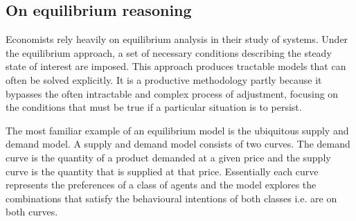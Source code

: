 





\subsection{On equilibrium reasoning }
Economists rely heavily on equilibrium analysis in their study of systems. 
Under the equilibrium approach, a set of necessary conditions describing the steady state of interest are imposed. This approach produces tractable models that can often be solved explicitly. It is a productive methodology partly because it bypasses the often intractable and complex process of adjustment, focusing on the conditions that must be true if a particular situation is to persist. 


The most familiar example of an equilibrium model is the ubiquitous supply and demand model. A supply and demand model consists of two curves. The demand curve is the quantity of a product demanded at a given price and the supply curve is the quantity that is supplied at that price. Essentially each curve represents the preferences of a class of agents and the model explores the combinations that satisfy the behavioural intentions of both classes i.e. are on both curves. 
 

